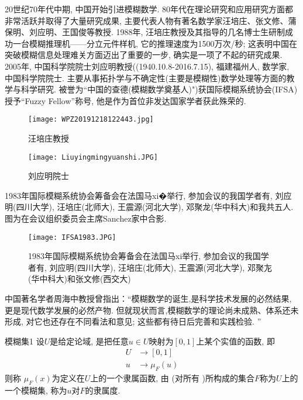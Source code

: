 {20世纪70年代中期, 中国开始引进模糊数学. 80年代在理论研究和应用研究方面都非常活跃并取得了大量研究成果, 主要代表人物有著名数学家汪培庄、张文修、蒲保明、刘应明、王国俊等教授. 1988年, 汪培庄教授及其指导的几名博士生研制成功一台模糊推理机——分立元件样机, 它的推理速度为1500万次/秒; 这表明中国在突破模糊信息处理难关方面迈出了重要的一步, 确实是一项了不起的研究成果. 2005年, 中国科学院院士刘应明教授((1940.10.8-2016.7.15), 福建福州人, 数学家, 中国科学院院士. 主要从事拓扑学与不确定性(主要是模糊性)数学处理等方面的教学与科学研究. 被誉为“中国的查德(模糊数学奠基人)")获国际模糊系统协会(IFSA)授予“Fuzzy Fellow”称号, 他是作为首位非发达国家学者获此殊荣的.
\begin{figure}[H]
\centering
\texttt{[image: WPZ20191218122443.jpg]}
\caption{汪培庄教授}
\label{WPZ20191218122443}
\end{figure}
\begin{figure}[H]
\centering
\texttt{[image: Liuyingmingyuanshi.JPG]}
\caption{刘应明院士}
\label{WPZ20191218122443}
\end{figure}
1983年国际模糊系统协会筹备会在法国马xi�举行, 参加会议的我国学者有, 刘应明(四川大学), 汪培庄(北师大), 王震源(河北大学), 邓聚龙(华中科大)和我共五人. 图为在会议组织委员会主席Sanchez家中合影.

\begin{figure}[H]
\centering
\texttt{[image: IFSA1983.JPG]}
\caption{1983年国际模糊系统协会筹备会在法国马xi举行, 参加会议的我国学者有, 刘应明(四川大学), 汪培庄(北师大), 王震源(河北大学), 邓聚㔫(华中科大)和张文修(西交大)}
\label{WPZ20191218122443}
\end{figure}
中国著名学者周海中教授曾指出：“模糊数学的诞生,是科学技术发展的必然结果, 更是现代数学发展的必然产物. 但就现状而言,模糊数学的理论尚未成熟、体系还未形成, 对它也还存在不同看法和意见; 这些都有待日后完善和实践检验. ”
\begin{mydef}{模糊集}{1}
设$U$是给定论域,   是把任意$u\in U$映射为$[0, 1]$上某个实值的函数, 即
\begin{align}
  U&\rightarrow [0, 1]\\
  u&\rightarrow \mu_F(u)
\end{align}
则称 $ \mu_F(x)$为定义在$U$上的一个隶属函数, 由   (对所有    )所构成的集合$F$称为$U$上的一个模糊集, 称为$u$对$F$的隶属度.
\end{mydef}

}
